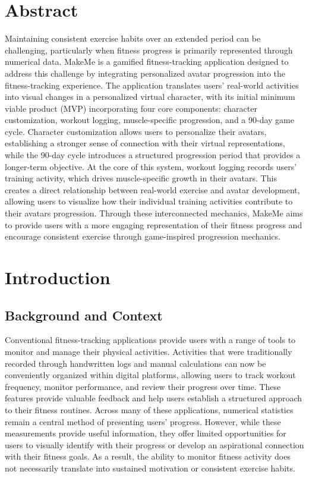 \documentclass[11pt]{article}
\begin{document}
\section{Abstract}
Maintaining consistent exercise habits over an extended period can be challenging,
particularly when fitness progress is primarily represented through numerical data.
MakeMe is a gamified fitness-tracking application designed to address this challenge by
integrating personalized avatar progression into the fitness-tracking experience.
The application translates users' real-world activities into visual changes in a personalized
virtual character, with its initial minimum viable product (MVP) incorporating four core
components: character customization, workout logging, muscle-specific progression,
and a 90-day game cycle. Character customization allows users to personalize their avatars,
establishing a stronger sense of connection with their virtual representations,
while the 90-day cycle introduces a structured progression period that provides a longer-term
objective. At the core of this system, workout logging records users' training activity,
which drives muscle-specific growth in their avatars. This creates a direct relationship
between real-world exercise and avatar development, allowing users to visualize
how their individual training activities contribute to their avatars progression.
Through these interconnected mechanics, MakeMe aims to provide users with a more engaging
representation of their fitness progress and encourage consistent exercise through
game-inspired progression mechanics.



\section{Introduction}

\subsection{Background and Context}
Conventional fitness-tracking applications provide users with a range of tools to monitor
and manage their physical activities. Activities that were traditionally recorded through
handwritten logs and manual calculations can now be conveniently organized within digital
platforms, allowing users to track workout frequency, monitor performance, and review their 
progress over time. These features provide valuable feedback and help users establish a
structured approach to their fitness routines. Across many of these applications,
numerical statistics remain a central method of presenting users' progress. However,
while these measurements provide useful information, they offer limited opportunities
for users to visually identify with their progress or develop an aspirational connection
with their fitness goals. As a result, the ability to monitor fitness activity does not
necessarily translate into sustained motivation or consistent exercise habits. 
\end{document}
